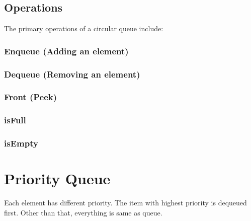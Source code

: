\subsection*{Operations}
The primary operations of a circular queue include:

\subsubsection*{Enqueue (Adding an element)}
\subsubsection*{Dequeue (Removing an element)}
\subsubsection*{Front (Peek)}
\subsubsection*{isFull}
\subsubsection*{isEmpty}

\section{Priority Queue}
\label{sec:priority-queue}
Each element has different priority. The item with highest priority is dequeued
first. Other than that, everything is same as queue.
